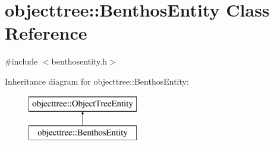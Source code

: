 \hypertarget{classobjecttree_1_1_benthos_entity}{}\section{objecttree\+::Benthos\+Entity Class Reference}
\label{classobjecttree_1_1_benthos_entity}


{\ttfamily \#include $<$benthosentity.\+h$>$}

Inheritance diagram for objecttree\+::Benthos\+Entity\+:\begin{figure}[H]
\begin{center}
\leavevmode
\includegraphics[height=2.000000cm]{df/d0f/classobjecttree_1_1_benthos_entity}
\end{center}
\end{figure}
